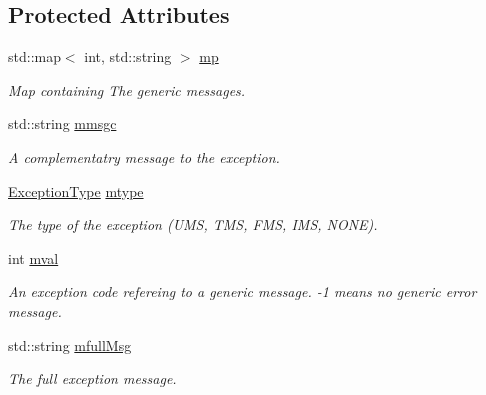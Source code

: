 \subsection*{Protected Attributes}
\begin{DoxyCompactItemize}
\item 
\hypertarget{classVishnuException_ab77135569ba3ca0d4ea97df7b1dfbb21}{
std::map$<$ int, std::string $>$ \hyperlink{classVishnuException_ab77135569ba3ca0d4ea97df7b1dfbb21}{mp}}
\label{classVishnuException_ab77135569ba3ca0d4ea97df7b1dfbb21}

\begin{DoxyCompactList}\small\item\em Map containing The generic messages. \item\end{DoxyCompactList}\item 
\hypertarget{classVishnuException_a57fffa81de4a47d1b2859f1b46362565}{
std::string \hyperlink{classVishnuException_a57fffa81de4a47d1b2859f1b46362565}{mmsgc}}
\label{classVishnuException_a57fffa81de4a47d1b2859f1b46362565}

\begin{DoxyCompactList}\small\item\em A complementatry message to the exception. \item\end{DoxyCompactList}\item 
\hypertarget{classVishnuException_afbac6f50e0096acb6fcec39415a1fb3f}{
\hyperlink{classVishnuException_ad9de1e07d1e54a454cd2f7f3883de001}{ExceptionType} \hyperlink{classVishnuException_afbac6f50e0096acb6fcec39415a1fb3f}{mtype}}
\label{classVishnuException_afbac6f50e0096acb6fcec39415a1fb3f}

\begin{DoxyCompactList}\small\item\em The type of the exception (UMS, TMS, FMS, IMS, NONE). \item\end{DoxyCompactList}\item 
\hypertarget{classVishnuException_aa9c23311f9ce4a48b7aeba210af55343}{
int \hyperlink{classVishnuException_aa9c23311f9ce4a48b7aeba210af55343}{mval}}
\label{classVishnuException_aa9c23311f9ce4a48b7aeba210af55343}

\begin{DoxyCompactList}\small\item\em An exception code refereing to a generic message. -\/1 means no generic error message. \item\end{DoxyCompactList}\item 
\hypertarget{classVishnuException_a5605d2d7aa6b3d69a9da046c7a3602e2}{
std::string \hyperlink{classVishnuException_a5605d2d7aa6b3d69a9da046c7a3602e2}{mfullMsg}}
\label{classVishnuException_a5605d2d7aa6b3d69a9da046c7a3602e2}

\begin{DoxyCompactList}\small\item\em The full exception message. \item\end{DoxyCompactList}\end{DoxyCompactItemize}


